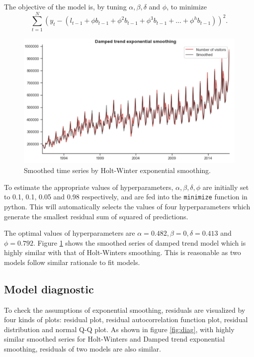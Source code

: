 \documentclass[letterpaper,12pt,twoside,]{pinp}
\begin{document}
The objective of the model is, by tuning \(\alpha, \beta, \delta\) and
\(\phi\), to minimize \[
\sum^N_{t=1}(y_t-(l_{t-1}+\phi b_{t-1}+\phi^2b_{t-1}+\phi^3b_{t-1}+...+\phi^hb_{t-1}))^2.
\]

\begin{figure}
\includegraphics[width=1\linewidth]{damped_smooth.png}
\centering
\caption{Smoothed time series by Holt-Winter exponential smoothing.}
\label{fig:damped_es}
\end{figure}

To estimate the appropriate values of hyperparameters,
\(\alpha, \beta,\delta,\phi\) are initially set to 0.1, 0.1, 0.05 and
0.98 respectively, and are fed into the \texttt{minimize} function in
python. This will automatically selects the values of four
hyperparameters which generate the smallest residual sum of squared of
predictions.

The optimal values of hyperparameters are
\(\alpha=0.482, \beta=0,\delta=0.413\) and \(\phi=0.792\). Figure
\ref{fig:damped_es} shows the smoothed series of damped trend model
which is highly similar with that of Holt-Winters smoothing. This is
reasonable as two models follow similar rationale to fit models.

\hypertarget{model-diagnostic}{%
\subsection{Model diagnostic}\label{model-diagnostic}}

To check the assumptions of exponential smoothing, residuals are
visualized by four kinds of plots: residual plot, residual
autocorrelation function plot, residual distribution and normal Q-Q
plot. As shown in figure \ref{fig:diag}, with highly similar smoothed
series for Holt-Winters and Damped trend exponential smoothing,
residuals of two models are also similar.
\end{document}
